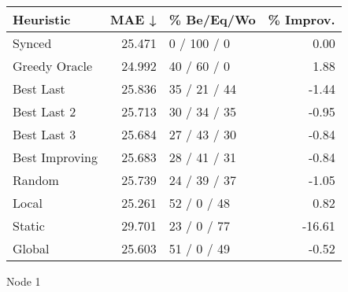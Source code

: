 \begin{tabular}{lrlr}
\toprule
\textbf{Heuristic} & \textbf{MAE ↓} & \textbf{\% Be/Eq/Wo} & \textbf{\% Improv.} \\
\midrule
            Synced &         25.471 &          0 / 100 / 0 &                0.00 \\
     Greedy Oracle &         24.992 &          40 / 60 / 0 &                1.88 \\
         Best Last &         25.836 &         35 / 21 / 44 &               -1.44 \\
       Best Last 2 &         25.713 &         30 / 34 / 35 &               -0.95 \\
       Best Last 3 &         25.684 &         27 / 43 / 30 &               -0.84 \\
    Best Improving &         25.683 &         28 / 41 / 31 &               -0.84 \\
            Random &         25.739 &         24 / 39 / 37 &               -1.05 \\
             Local &         25.261 &          52 / 0 / 48 &                0.82 \\
            Static &         29.701 &          23 / 0 / 77 &              -16.61 \\
            Global &         25.603 &          51 / 0 / 49 &               -0.52 \\
\bottomrule
\end{tabular}
\caption{Node 1}
\label{tab:iid_lr05_le1_bs2_1}
